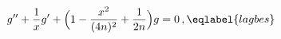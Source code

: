 \begin{equation}
g'' + \frac 1x g' +\Big(1- \frac{x^2}{(4n)^2}+\frac{1}{2n}\Big) g = 0 \,,
\eqlabel{lagbes}
\end{equation}

